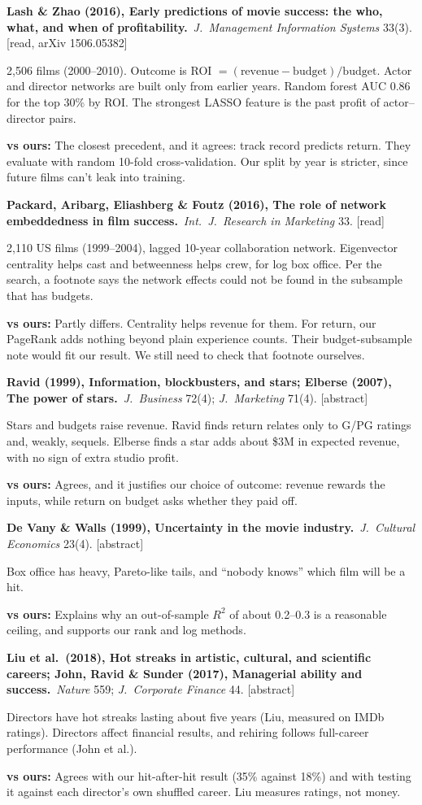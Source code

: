 \documentclass[10pt]{article}
\newcommand{\paper}[2]{\par\smallskip\textbf{#1}\ #2\par}
\newcommand{\vs}[1]{\par{\color{accent}\textbf{vs ours:}} #1\par}
\newcommand{\src}[1]{{\small\color{muted}[#1]}}
\begin{document}
\paper{Lash \& Zhao (2016), Early predictions of movie success: the who, what, and when of profitability.}{\textit{J.\ Management Information Systems} 33(3). \src{read, arXiv 1506.05382}}
2,506 films (2000--2010). Outcome is ROI $=(\text{revenue}-\text{budget})/\text{budget}$. Actor and director networks are built only from earlier years. Random forest AUC 0.86 for the top 30\% by ROI. The strongest LASSO feature is the past profit of actor--director pairs.
\vs{The closest precedent, and it agrees: track record predicts return. They evaluate with random 10-fold cross-validation. Our split by year is stricter, since future films can't leak into training.}

\paper{Packard, Aribarg, Eliashberg \& Foutz (2016), The role of network embeddedness in film success.}{\textit{Int.\ J.\ Research in Marketing} 33. \src{read}}
2,110 US films (1999--2004), lagged 10-year collaboration network. Eigenvector centrality helps cast and betweenness helps crew, for log box office. Per the search, a footnote says the network effects could not be found in the subsample that has budgets.
\vs{Partly differs. Centrality helps revenue for them. For return, our PageRank adds nothing beyond plain experience counts. Their budget-subsample note would fit our result. We still need to check that footnote ourselves.}

\paper{Ravid (1999), Information, blockbusters, and stars; Elberse (2007), The power of stars.}{\textit{J.\ Business} 72(4); \textit{J.\ Marketing} 71(4). \src{abstract}}
Stars and budgets raise revenue. Ravid finds return relates only to G/PG ratings and, weakly, sequels. Elberse finds a star adds about \$3M in expected revenue, with no sign of extra studio profit.
\vs{Agrees, and it justifies our choice of outcome: revenue rewards the inputs, while return on budget asks whether they paid off.}

\paper{De Vany \& Walls (1999), Uncertainty in the movie industry.}{\textit{J.\ Cultural Economics} 23(4). \src{abstract}}
Box office has heavy, Pareto-like tails, and ``nobody knows'' which film will be a hit.
\vs{Explains why an out-of-sample $R^2$ of about 0.2--0.3 is a reasonable ceiling, and supports our rank and log methods.}

\paper{Liu et al.\ (2018), Hot streaks in artistic, cultural, and scientific careers; John, Ravid \& Sunder (2017), Managerial ability and success.}{\textit{Nature} 559; \textit{J.\ Corporate Finance} 44. \src{abstract}}
Directors have hot streaks lasting about five years (Liu, measured on IMDb ratings). Directors affect financial results, and rehiring follows full-career performance (John et al.).
\vs{Agrees with our hit-after-hit result (35\% against 18\%) and with testing it against each director's own shuffled career. Liu measures ratings, not money.}
\end{document}
